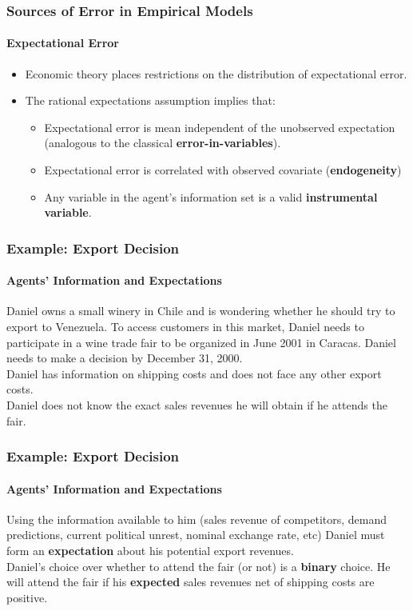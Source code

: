 \begin{frame}
\frametitle{Sources of Error in Empirical Models}
\framesubtitle{Expectational Error}

\begin{itemize}
	\item Economic theory places restrictions on the distribution of expectational error. 
	\item The rational expectations assumption implies that:
	\begin{itemize}
	 	\item Expectational error is mean independent of the unobserved expectation (analogous to the classical \textbf{error-in-variables}).
		\item Expectational error is correlated with observed covariate (\textbf{endogeneity})
		\item Any variable in the agent's information set is a valid \textbf{instrumental variable}.
	\end{itemize}	
\end{itemize}
\end{frame}

\begin{frame}
\frametitle{Example: Export Decision}
\framesubtitle{Agents' Information and Expectations}

Daniel owns a small winery in Chile and is wondering whether he should try to export to Venezuela. To access customers in this market, Daniel needs to participate in a wine trade fair to be organized in June 2001 in Caracas. Daniel needs to make a decision by December 31, 2000.\\
\bigskip
Daniel has information on shipping costs and does not face any other export costs.\\
\bigskip
Daniel does not know the exact sales revenues he will obtain if he attends the fair.  
\end{frame}

\begin{frame}
\frametitle{Example: Export Decision}
\framesubtitle{Agents' Information and Expectations}

Using the information available to him (sales revenue of competitors, demand predictions, current political unrest, nominal exchange rate, etc) Daniel must form an \textbf{expectation} about his potential export revenues.\\
\bigskip
Daniel's choice over whether to attend the fair (or not) is a \textbf{binary} choice. He will attend the fair if his \textbf{expected} sales revenues net of shipping costs are positive.
\end{frame}


